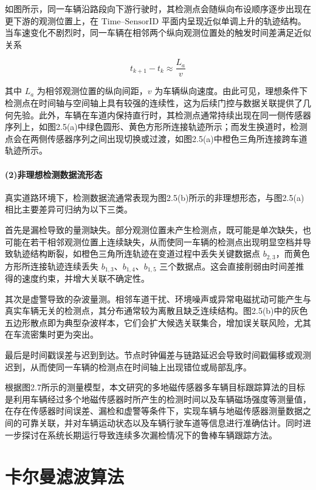 \documentclass{xdupgthesis}
\begin{document}
如图所示，同一车辆沿路段向下游行驶时，其检测点会随纵向布设顺序逐步出现在更下游的观测位置上，在 $\text{Time--SensorID}$ 平面内呈现近似单调上升的轨迹结构。当车速变化不剧烈时，同一车辆在相邻两个纵向观测位置处的触发时间差满足近似关系

\begin{equation}
	t_{k+1}-t_k \approx \frac{L_a}{v}
	\tag{2-7}
\end{equation}

其中 $L_a$ 为相邻观测位置的纵向间距，$v$ 为车辆纵向速度。由此可见，理想条件下检测点在时间轴与空间轴上具有较强的连续性，这为后续门控与数据关联提供了几何先验。此外，车辆在车道内保持直行时，其检测点通常持续出现在同一侧传感器序列上，如图2.5(a)中绿色圆形、黄色方形所连接轨迹所示；而发生换道时，检测点会在两侧传感器序列之间出现切换或过渡，如图2.5(a)中橙色三角所连接跨车道轨迹所示。

\paragraph{(2)非理想检测数据流形态}


真实道路环境下，检测数据流通常表现为图2.5(b)所示的非理想形态，与图2.5(a)相比主要差异可归纳为以下三类。

首先是漏检导致的量测缺失。部分观测位置未产生检测点，既可能是单次缺失，也可能在若干相邻观测位置上连续缺失，从而使同一车辆的检测点出现明显空档并导致轨迹结构断裂，如橙色三角所连轨迹在变道过程中丢失关键数据点 $b_{2,3}$，而黄色方形所连接轨迹连续丢失 $b_{1,3}$、$b_{1,4}$、$b_{1,5}$ 三个数据点。这会直接削弱由时间差推得的速度约束，并增大关联不确定性。

其次是虚警导致的杂波量测。相邻车道干扰、环境噪声或异常电磁扰动可能产生与真实车辆无关的检测点，其分布通常较为离散且缺乏连续结构。图2.5(b)中的灰色五边形散点即为典型杂波样本，它们会扩大候选关联集合，增加误关联风险，尤其在车流密集时更为突出。

最后是时间戳误差与迟到到达。节点时钟偏差与链路延迟会导致时间戳偏移或观测迟到，从而使同一车辆的检测点在时间轴上出现错位或局部乱序。

根据图2.7所示的测量模型，本文研究的多地磁传感器多车辆目标跟踪算法的目标是利用车辆经过多个地磁传感器时所产生的检测时间以及车辆磁场强度等测量值，在存在传感器时间误差、漏检和虚警等条件下，实现车辆与地磁传感器测量数据之间的可靠关联，并对车辆运动状态以及车辆行驶车道等信息进行准确估计。同时进一步探讨在系统长期运行导致连续多次漏检情况下的鲁棒车辆跟踪方法。


\section{卡尔曼滤波算法}
\end{document}
